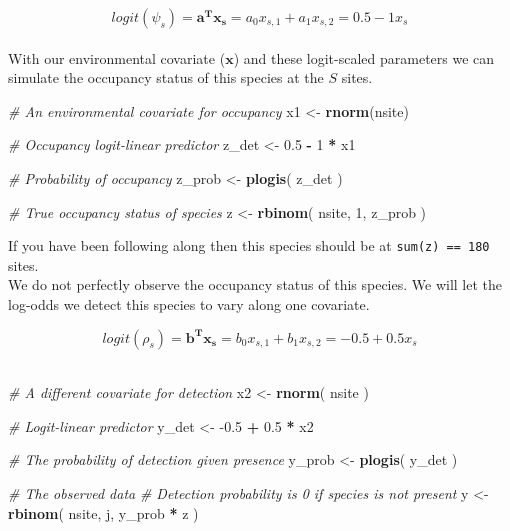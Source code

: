 \documentclass[
]{article}
\newenvironment{Shaded}{\begin{snugshade}}{\end{snugshade}}
\newcommand{\CommentTok}[1]{\textcolor[rgb]{0.56,0.35,0.01}{\textit{#1}}}
\newcommand{\DecValTok}[1]{\textcolor[rgb]{0.00,0.00,0.81}{#1}}
\newcommand{\FloatTok}[1]{\textcolor[rgb]{0.00,0.00,0.81}{#1}}
\newcommand{\KeywordTok}[1]{\textcolor[rgb]{0.13,0.29,0.53}{\textbf{#1}}}
\newcommand{\NormalTok}[1]{#1}
\newcommand{\OperatorTok}[1]{\textcolor[rgb]{0.81,0.36,0.00}{\textbf{#1}}}
\newcommand{\StringTok}[1]{\textcolor[rgb]{0.31,0.60,0.02}{#1}}
\begin{document}
\[logit(\psi_s) = \bm{a^T x_s} = a_0 x_{s,1} + a_1 x_{s,2} = 0.5 - 1 x_s\]\\
With our environmental covariate (\(\bm{x}\)) and these logit-scaled
parameters we can simulate the occupancy status of this species at the
\(S\) sites.

\begin{Shaded}
\begin{Highlighting}[]
\CommentTok{# An environmental covariate for occupancy}
\NormalTok{x1 <-}\StringTok{ }\KeywordTok{rnorm}\NormalTok{(nsite)}

\CommentTok{# Occupancy  logit-linear predictor}
\NormalTok{z_det <-}\StringTok{ }\FloatTok{0.5} \OperatorTok{-}\StringTok{ }\DecValTok{1} \OperatorTok{*}\StringTok{ }\NormalTok{x1 }

\CommentTok{# Probability of occupancy}
\NormalTok{z_prob <-}\StringTok{ }\KeywordTok{plogis}\NormalTok{(}
\NormalTok{  z_det}
\NormalTok{)}

\CommentTok{# True occupancy status of species}
\NormalTok{z <-}\StringTok{ }\KeywordTok{rbinom}\NormalTok{(}
\NormalTok{  nsite,}
  \DecValTok{1}\NormalTok{,}
\NormalTok{  z_prob}
\NormalTok{)}
\end{Highlighting}
\end{Shaded}

If you have been following along then this species should be at
\texttt{sum(z)\ ==\ 180} sites.\\
We do not perfectly observe the occupancy status of this species. We
will let the log-odds we detect this species to vary along one
covariate.

\[logit(\rho_s) = \bm{b^T x_s} = b_0 x_{s,1} + b_1 x_{s,2} = -0.5 + 0.5 x_s\]\\

\begin{Shaded}
\begin{Highlighting}[]
\CommentTok{# A different covariate for detection}
\NormalTok{x2 <-}\StringTok{ }\KeywordTok{rnorm}\NormalTok{(}
\NormalTok{  nsite}
\NormalTok{)}

\CommentTok{# Logit-linear predictor}
\NormalTok{y_det <-}\StringTok{ }\FloatTok{-0.5} \OperatorTok{+}\StringTok{ }\FloatTok{0.5} \OperatorTok{*}\StringTok{ }\NormalTok{x2}

\CommentTok{# The probability of detection given presence}
\NormalTok{y_prob <-}\StringTok{ }\KeywordTok{plogis}\NormalTok{(}
\NormalTok{  y_det}
\NormalTok{)}

\CommentTok{# The observed data }
\CommentTok{#  Detection probability is 0 if species is not present}
\NormalTok{y <-}\StringTok{ }\KeywordTok{rbinom}\NormalTok{(}
\NormalTok{  nsite,}
\NormalTok{  j,}
\NormalTok{  y_prob }\OperatorTok{*}\StringTok{ }\NormalTok{z}
\NormalTok{)}
\end{Highlighting}
\end{Shaded}
\end{document}
